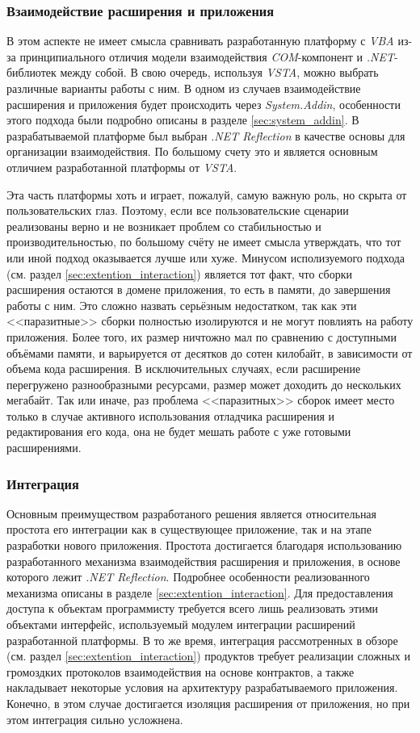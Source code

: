 \subsubsection{Взаимодействие расширения и приложения}

В этом аспекте не имеет смысла сравнивать разработанную платформу с {\it VBA} из-за принципиального отличия модели взаимодействия {\it COM}-компонент и {\it .NET}-библиотек между собой. В свою очередь, используя {\it VSTA}, можно выбрать различные варианты работы с ним. В одном из случаев взаимодействие расширения и приложения будет происходить через {\it System.Addin}, особенности этого подхода были подробно описаны в разделе \ref{sec:system_addin}. В разрабатываемой платформе был выбран {\it .NET Reflection} в качестве основы для организации взаимодействия. По большому счету это и является основным отличием разработанной платформы от {\it VSTA}.

Эта часть платформы хоть и играет, пожалуй, самую важную роль, но скрыта от пользовательских глаз. Поэтому, если все пользовательские сценарии реализованы верно и не возникает проблем со стабильностью и производительностью, по большому счёту не имеет смысла утверждать, что тот или иной подход оказывается лучше или хуже. Минусом исполизуемого подхода (см. раздел \ref{sec:extention_interaction}) является тот факт, что сборки расширения остаются в домене приложения, то есть в памяти, до завершения работы с ним. Это сложно назвать серьёзным недостатком, так как эти <<паразитные>> сборки полностью изолируются и не могут повлиять на работу приложения. Более того, их размер ничтожно мал по сравнению с доступными объёмами памяти, и варьируется от десятков до сотен килобайт, в зависимости от объема кода расширения. В исключительных случаях, если расширение перегружено разнообразными ресурсами, размер может доходить до нескольких мегабайт. Так или иначе, раз проблема <<паразитных>> сборок имеет место только в случае активного использования отладчика расширения и редактирования его кода, она не будет мешать работе с уже готовыми расширениями.

\subsubsection{Интеграция}

Основным преимуществом разработаного решения является относительная простота его интеграции как в существующее приложение, так и на этапе разработки нового приложения. Простота достигается благодаря использованию разработанного механизма взаимодействия расширения и приложения, в основе которого лежит {\it .NET Reflection}. Подробнее особенности реализованного механизма описаны в разделе \ref{sec:extention_interaction}. Для предоставления доступа к объектам программисту требуется всего лишь реализовать этими объектами интерфейс, используемый модулем интеграции расширений разработанной платформы. В то же время, интеграция рассмотренных в обзоре (см. раздел \ref{sec:extention_interaction}) продуктов требует реализации сложных и громоздких протоколов взаимодействия на основе контрактов, а также накладывает некоторые условия на архитектуру разрабатываемого приложения. Конечно, в этом случае достигается изоляция расширения от приложения, но при этом интеграция сильно усложнена.

